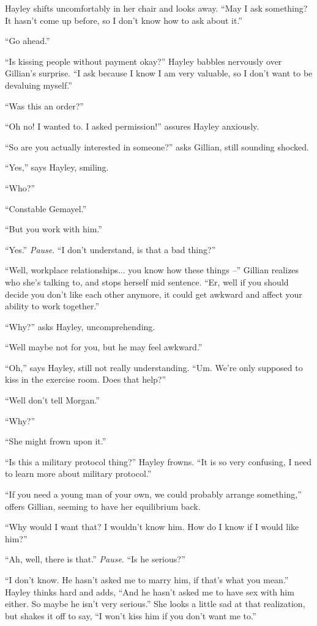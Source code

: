 Hayley shifts uncomfortably in her chair and looks away. ``May I ask something?  It hasn't come up before, so I don't know how to ask about it.''

``Go ahead.''

``Is kissing people without payment okay?''  Hayley babbles nervously over Gillian's surprise. ``I ask because I know I am very valuable, so I don't want to be devaluing myself.''

``Was this an order?'' 

``Oh no!  I wanted to.  I asked permission!'' assures Hayley anxiously.

``So are you actually interested in someone?'' asks Gillian, still sounding shocked.

``Yes,'' says Hayley, smiling.

``Who?''

``Constable Gemayel.''

``But you work with him.''

``Yes.''  \textit{Pause}.  ``I don't understand, is that a bad thing?''

``Well, workplace relationships... you know how these things --'' Gillian realizes who she's talking to, and stops herself mid sentence.  ``Er, well if you should decide you don't like each other anymore, it could get awkward and affect your ability to work together.''

``Why?'' asks Hayley, uncomprehending.

``Well maybe not for you, but he may feel awkward.''

``Oh,'' says Hayley, still not really understanding.  ``Um.  We're only supposed to kiss in the exercise room.  Does that help?''

``Well don't tell Morgan.''

``Why?''

``She might frown upon it.''

``Is this a military protocol thing?''  Hayley frowns.  ``It is so very confusing, I need to learn more about military protocol.''

``If you need a young man of your own, we could probably arrange something,'' offers Gillian, seeming to have her equilibrium back.

``Why would I want that?  I wouldn't know him.  How do I know if I would like him?''

``Ah, well, there is that.'' \textit{Pause}.  ``Is he serious?''

``I don't know.  He hasn't asked me to marry him, if that's what you mean.''  Hayley thinks hard and adds, ``And he hasn't asked me to have sex with him either.  So maybe he isn't very serious.''  She looks a little sad at that realization, but shakes it off to say,  ``I won't kiss him if you don't want me to.''

